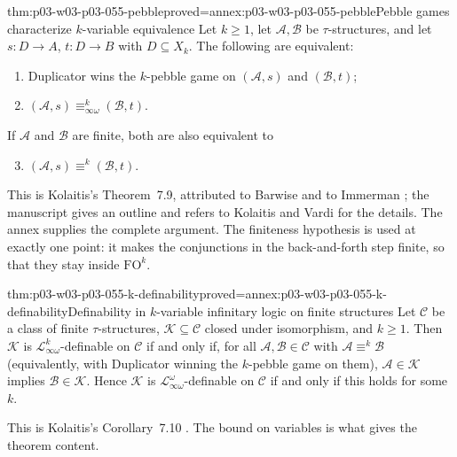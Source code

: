 \begin{hbtheorem}{thm:p03-w03-p03-055-pebble}{proved=annex:p03-w03-p03-055-pebble}{Pebble games characterize \(k\)-variable equivalence}
Let \(k\ge1\), let \(\mathcal A,\mathcal B\) be \(\tau\)-structures, and
let \(s\colon D\to A\), \(t\colon D\to B\) with \(D\subseteq X_k\).
The following are equivalent:
\begin{enumerate}
\item Duplicator wins the \(k\)-pebble game on \((\mathcal A,s)\) and
      \((\mathcal B,t)\);
\item \((\mathcal A,s)\equiv^k_{\infty\omega}(\mathcal B,t)\).
\end{enumerate}
If \(\mathcal A\) and \(\mathcal B\) are finite, both are also equivalent to
\begin{enumerate}\setcounter{enumi}{2}
\item \((\mathcal A,s)\equiv^k(\mathcal B,t)\).
\end{enumerate}
\end{hbtheorem}

This is Kolaitis's Theorem~7.9, attributed to Barwise and to Immerman
\cite[pp.~58--59]{Kolaitis2003ExpressivePowerNotes}; the manuscript gives an
outline and refers to Kolaitis and Vardi for the details. The annex supplies
the complete argument. The finiteness hypothesis is used at exactly one
point: it makes the conjunctions in the back-and-forth step finite, so that
they stay inside \(\mathrm{FO}^k\).

\begin{hbtheorem}{thm:p03-w03-p03-055-k-definability}{proved=annex:p03-w03-p03-055-k-definability}{Definability in \(k\)-variable infinitary logic on finite structures}
Let \(\mathcal C\) be a class of finite \(\tau\)-structures,
\(\mathcal K\subseteq\mathcal C\) closed under isomorphism, and \(k\ge1\).
Then \(\mathcal K\) is \(\mathcal L^k_{\infty\omega}\)-definable on
\(\mathcal C\) if and only if, for all \(\mathcal A,\mathcal B\in\mathcal C\)
with \(\mathcal A\equiv^k\mathcal B\) (equivalently, with Duplicator
winning the \(k\)-pebble game on them), \(\mathcal A\in\mathcal K\) implies
\(\mathcal B\in\mathcal K\). Hence \(\mathcal K\) is
\(\mathcal L^\omega_{\infty\omega}\)-definable on \(\mathcal C\) if and only
if this holds for some \(k\).
\end{hbtheorem}

This is Kolaitis's Corollary~7.10
\cite[p.~59]{Kolaitis2003ExpressivePowerNotes}. The bound on variables is
what gives the theorem content.

